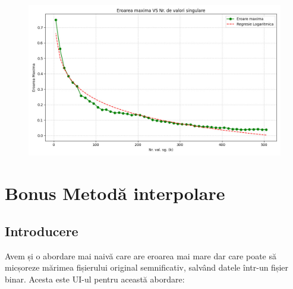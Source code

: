 \documentclass[12pt]{article}
\begin{document}
\begin{figure}[h!]
    \centering
    \includegraphics[width=1\textwidth]{EROARE.jpeg}
\end{figure}

\newpage

\section{Bonus Metodă interpolare}

\subsection{Introducere}

Avem și o abordare mai naivă care are eroarea mai mare dar care poate să micșoreze mărimea fișierului original semnificativ, salvând datele într-un fișier binar.
Acesta este UI-ul pentru această abordare:
\end{document}
